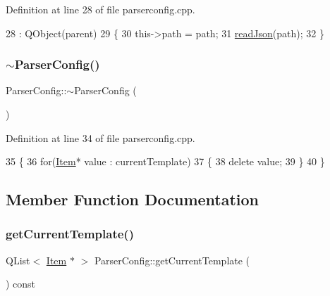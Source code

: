 Definition at line 28 of file parserconfig.\+cpp.


\begin{DoxyCode}
28                                                         : QObject(parent)
29 \{
30     this->path = path;
31     \hyperlink{class_parser_config_af0029e03ae57af23c7f85393635ecb56}{readJson}(path);
32 \}
\end{DoxyCode}
\mbox{\label{class_parser_config_a9a23d768f0a279e163e1f0f49dfc0d9e}} 
\subsubsection{\texorpdfstring{$\sim$\+Parser\+Config()}{~ParserConfig()}}
{\footnotesize\ttfamily Parser\+Config\+::$\sim$\+Parser\+Config (\begin{DoxyParamCaption}{ }\end{DoxyParamCaption})}



Definition at line 34 of file parserconfig.\+cpp.


\begin{DoxyCode}
35 \{
36     \textcolor{keywordflow}{for}(\hyperlink{class_item}{Item}* value : currentTemplate)
37     \{
38         \textcolor{keyword}{delete} value;
39     \}
40 \}
\end{DoxyCode}


\subsection{Member Function Documentation}
\mbox{\label{class_parser_config_a59e44b4b1bc104b9de240cb7640bb63f}} 
\subsubsection{\texorpdfstring{get\+Current\+Template()}{getCurrentTemplate()}}
{\footnotesize\ttfamily Q\+List$<$ \hyperlink{class_item}{Item} $\ast$ $>$ Parser\+Config\+::get\+Current\+Template (\begin{DoxyParamCaption}{ }\end{DoxyParamCaption}) const}



